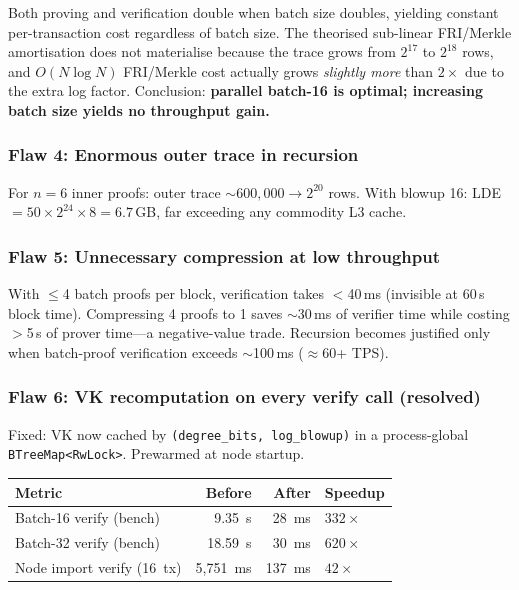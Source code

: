 \documentclass[11pt]{article}
\begin{document}
Both proving and verification double when batch size doubles, yielding
constant per-transaction cost regardless of batch size. The theorised
sub-linear FRI/Merkle amortisation does not materialise because the trace
grows from $2^{17}$ to $2^{18}$ rows, and $O(N \log N)$ FRI/Merkle cost
actually grows \emph{slightly more} than $2\times$ due to the extra log
factor. Conclusion: \textbf{parallel batch-16 is optimal; increasing batch
size yields no throughput gain.}

\subsubsection{Flaw 4: Enormous outer trace in recursion}

For $n = 6$ inner proofs: outer trace $\sim 600{,}000 \to 2^{20}$ rows.
With blowup 16: LDE $= 50 \times 2^{24} \times 8 = 6.7$\,GB, far exceeding
any commodity L3 cache.

\subsubsection{Flaw 5: Unnecessary compression at low throughput}

With $\le$4 batch proofs per block, verification takes $<$40\,ms (invisible
at 60\,s block time). Compressing 4 proofs to 1 saves $\sim$30\,ms of
verifier time while costing $>$5\,s of prover time---a negative-value trade.
Recursion becomes justified only when batch-proof verification exceeds
$\sim$100\,ms ($\approx$60+ TPS).

\subsubsection{Flaw 6: VK recomputation on every verify call (resolved)}

Fixed: VK now cached by \texttt{(degree\_bits, log\_blowup)} in a
process-global \texttt{BTreeMap<RwLock>}. Prewarmed at node startup.

\begin{center}
\begin{tabular}{@{}lrrl@{}}
\toprule
\textbf{Metric} & \textbf{Before} & \textbf{After} & \textbf{Speedup} \\
\midrule
Batch-16 verify (bench) & 9.35~s & 28~ms & $332\times$ \\
Batch-32 verify (bench) & 18.59~s & 30~ms & $620\times$ \\
Node import verify (16~tx) & 5{,}751~ms & 137~ms & $42\times$ \\
\bottomrule
\end{tabular}
\end{center}
\end{document}
